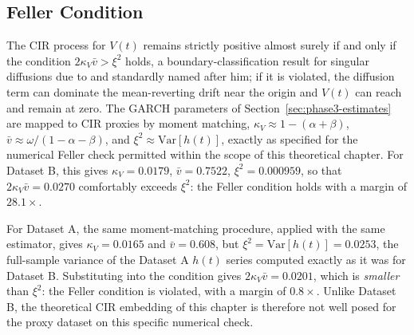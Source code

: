 \subsection{Feller Condition}
\label{sec:phase5-feller}

The CIR process for $V(t)$ remains strictly positive almost surely if and only if the condition $2\kappa_V \bar v > \xi^2$ holds, a boundary-classification result for singular diffusions due to \citet{Feller1951} and standardly named after him; if it is violated, the diffusion term can dominate the mean-reverting drift near the origin and $V(t)$ can reach and remain at zero. The GARCH parameters of Section~\ref{sec:phase3-estimates} are mapped to CIR proxies by moment matching, $\kappa_V \approx 1-(\alpha+\beta)$, $\bar v \approx \omega/(1-\alpha-\beta)$, and $\xi^2 \approx \mathrm{Var}[h(t)]$, exactly as specified for the numerical Feller check permitted within the scope of this theoretical chapter. For Dataset B, this gives $\kappa_V = 0.0179$, $\bar v = 0.7522$, $\xi^2 = 0.000959$, so that $2\kappa_V\bar v = 0.0270$ comfortably exceeds $\xi^2$: the Feller condition holds with a margin of $28.1\times$.

For Dataset A, the same moment-matching procedure, applied with the same estimator, gives $\kappa_V = 0.0165$ and $\bar v = 0.608$, but $\xi^2 = \mathrm{Var}[h(t)] = 0.0253$, the full-sample variance of the Dataset A $h(t)$ series computed exactly as it was for Dataset B. Substituting into the condition gives $2\kappa_V\bar v = 0.0201$, which is \emph{smaller} than $\xi^2$: the Feller condition is violated, with a margin of $0.8\times$. Unlike Dataset B, the theoretical CIR embedding of this chapter is therefore not well posed for the proxy dataset on this specific numerical check.

